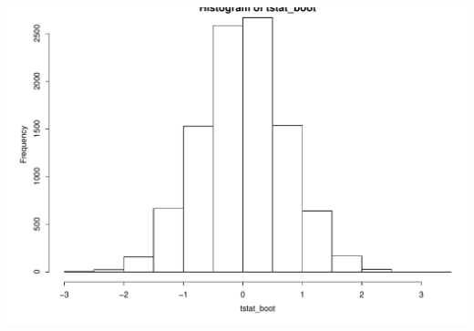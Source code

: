 \documentclass{beamer}\usepackage[]{graphicx}\usepackage[]{color}
\newenvironment{knitrout}{}{} %
\renewenvironment{knitrout}{\begin{spacing}{0.75}\begin{tiny}}{\end{tiny}\end{spacing}}
\begin{document}
\begin{frame}[fragile]

\begin{knitrout}\small
{}\color{fgcolor}

{\centering \includegraphics[width=0.99\linewidth]{figure/graphics-unnamed-chunk-7-1} 

}



\end{knitrout}

\end{frame}
\end{document}
